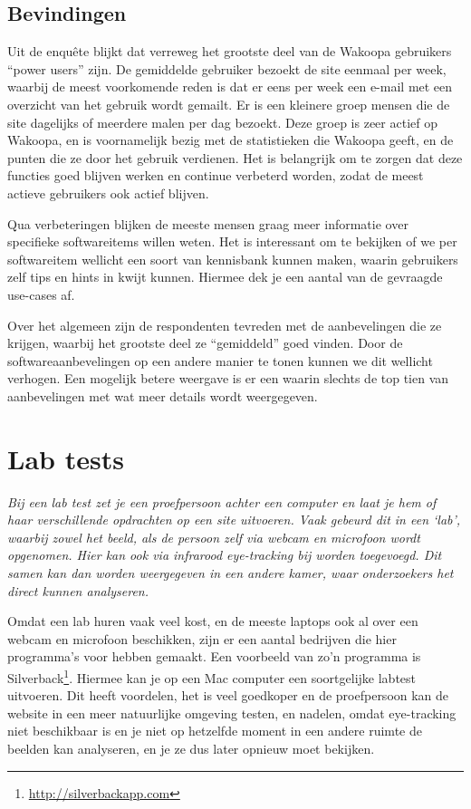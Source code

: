 \documentclass[a4paper, 10pt, pdftex]{report}
\begin{document}
  \subsection{Bevindingen}
    Uit de enqu\^ete blijkt dat verreweg het grootste deel van de Wakoopa gebruikers ``power users'' zijn. De gemiddelde gebruiker bezoekt de site eenmaal per week, waarbij de meest voorkomende reden is dat er eens per week een e-mail met een overzicht van het gebruik wordt gemailt. Er is een kleinere groep mensen die de site dagelijks of meerdere malen per dag bezoekt. Deze groep is zeer actief op Wakoopa, en is voornamelijk bezig met de statistieken die Wakoopa geeft, en de punten die ze door het gebruik verdienen. Het is belangrijk om te zorgen dat deze functies goed blijven werken en continue verbeterd worden, zodat de meest actieve gebruikers ook actief blijven.

    Qua verbeteringen blijken de meeste mensen graag meer informatie over specifieke softwareitems willen weten. Het is interessant om te bekijken of we per softwareitem wellicht een soort van kennisbank kunnen maken, waarin gebruikers zelf tips en hints in kwijt kunnen. Hiermee dek je een aantal van de gevraagde use-cases af.

    Over het algemeen zijn de respondenten tevreden met de aanbevelingen die ze krijgen, waarbij het grootste deel ze ``gemiddeld'' goed vinden. Door de softwareaanbevelingen op een andere manier te tonen kunnen we dit wellicht verhogen. Een mogelijk betere weergave is er een waarin slechts de top tien van aanbevelingen met wat meer details wordt weergegeven.

    \newpage
    \section{Lab tests}
    \textit{Bij een lab test zet je een proefpersoon achter een computer en laat je hem of haar verschillende opdrachten op een site uitvoeren. Vaak gebeurd dit in een `lab', waarbij zowel het beeld, als de persoon zelf via webcam en microfoon wordt opgenomen. Hier kan ook via infrarood eye-tracking bij worden toegevoegd. Dit samen kan dan worden weergegeven in een andere kamer, waar onderzoekers het direct kunnen analyseren.}

    Omdat een lab huren vaak veel kost, en de meeste laptops ook al over een webcam en microfoon beschikken, zijn er een aantal bedrijven die hier programma's voor hebben gemaakt. Een voorbeeld van zo'n programma is Silverback\footnote{\url{http://silverbackapp.com}}. Hiermee kan je op een Mac computer een soortgelijke labtest uitvoeren. Dit heeft voordelen, het is veel goedkoper en de proefpersoon kan de website in een meer natuurlijke omgeving testen, en nadelen, omdat eye-tracking niet beschikbaar is en je niet op hetzelfde moment in een andere ruimte de beelden kan analyseren, en je ze dus later opnieuw moet bekijken.
\end{document}
